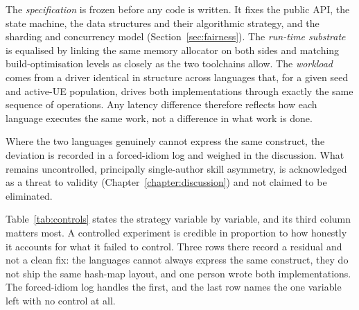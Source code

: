 \documentclass[english,twoside,openright,a4paper,censored,csm,software-track-2020]{HYthesisML}
\begin{document}
The \emph{specification} is frozen before any code is written. It fixes the public API, the
state machine, the data structures and their algorithmic strategy, and the sharding and
concurrency model (Section~\ref{sec:fairness}). The \emph{run-time substrate} is equalised by
linking the same memory allocator on both sides and matching build-optimisation levels as
closely as the two toolchains allow. The \emph{workload} comes from a driver identical in
structure across languages that, for a given seed and active-UE population, drives both
implementations through exactly the same sequence of operations. Any latency difference
therefore reflects how each language executes the same work, not a difference in what work is
done.

Where the two languages genuinely cannot express the same construct, the deviation is recorded
in a forced-idiom log and weighed in the discussion. What remains uncontrolled, principally
single-author skill asymmetry, is acknowledged as a threat to validity
(Chapter~\ref{chapter:discussion}) and not claimed to be eliminated.

Table~\ref{tab:controls} states the strategy variable by variable, and its third column matters
most. A controlled experiment is credible in proportion to how honestly it accounts for what it
failed to control. Three rows there record a residual and not a clean fix: the languages cannot
always express the same construct, they do not ship the same hash-map layout, and one person
wrote both implementations. The forced-idiom log handles the first, and the last row names the
one variable left with no control at all.
\end{document}

